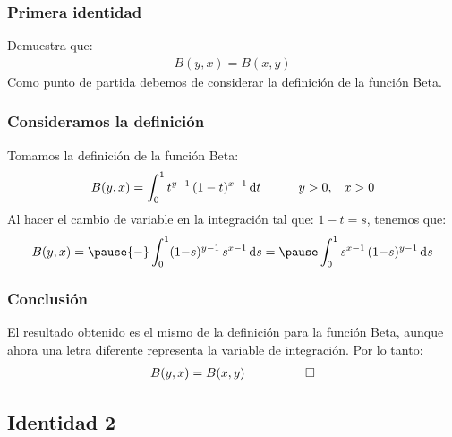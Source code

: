 \documentclass[12pt]{beamer}
\begin{document}
\begin{frame}
\frametitle{Primera identidad}
Demuestra que:
\begin{align*}
B(y, x) = B(x, y)
\end{align*}
\pause
Como punto de partida debemos de considerar la definición de la función Beta.
\end{frame}
\begin{frame}
\frametitle{Consideramos la definición}
Tomamos la definición de la función Beta:
\begin{align*}
B(y, x) = \int_{0}^{1} t^{y-1} \, (1 - t)^{x-1} \dd{t} \hspace{1cm} y > 0, \hspace{0.3cm} x > 0
\end{align*}
\pause
Al hacer el cambio de variable en la integración tal que: $1 - t = s$, tenemos que:
\pause
\begin{eqnarray*}
B(y, x) = \pause {-} \int_{0}^{1} (1 {-} s)^{y-1} \, s^{x-1} \dd{s} = \pause \int_{0}^{1} s^{x-1} \, (1 {-} s)^{y-1} \dd{s}
\end{eqnarray*}  
\end{frame}
\begin{frame}
\frametitle{Conclusión}
El resultado obtenido es el mismo de la definición para la función Beta, aunque ahora una letra diferente representa la variable de integración. \pause Por lo tanto:
\begin{align*}
B(y, x) = B(x, y) \hspace{1cm} \qed
\end{align*}
\end{frame}

\subsection{Identidad 2}
\end{document}
